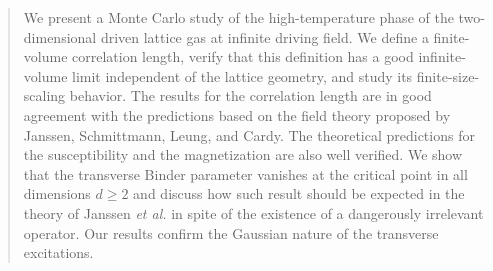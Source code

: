 \documentclass[12pt]{article}
\begin{document}
\newcommand{\co}{ {\cal O}}

\maketitle
\thispagestyle{empty}   %

\vspace{0.2cm}

\begin{abstract}
We present a Monte Carlo study of the high-temperature 
phase of the two-dimensional driven lattice gas 
at infinite driving field. We define a finite-volume 
correlation length, verify that this definition has a good 
infinite-volume limit independent of the lattice geometry, and 
study its finite-size-scaling behavior.  
The results for the correlation length are
in good agreement with the predictions based on the field theory
proposed by Janssen, Schmittmann, Leung, and Cardy.
The theoretical predictions for the susceptibility and 
the magnetization are also well verified.  
We show that the transverse Binder parameter vanishes at the 
critical point in all dimensions $d\ge 2$ and discuss how such 
result should be expected in the theory of Janssen {\em et al.} 
in spite of the existence of a dangerously irrelevant operator.
Our results confirm the Gaussian nature of the transverse excitations.
\end{abstract}

\clearpage


%
%

\newcommand{\reff}[1]{(\ref{#1})}
\newcommand{\kls}{{\sc KLS}}
\newcommand{\su}[2]{\frac{#1}{#2}}
\newcommand{\me}{{\it master equation}}
\newcommand{\db}{{\it detailed balance}}
\newcommand{\ve}[1]{{\bf #1}}

\newcommand{\dlg}{{\sc DLG}}
\newcommand{\fss}{{\sc FSS}}

\newcommand{\pe}[1]{#1_{\bot}}
\newcommand{\pa}[1]{#1_{\|}}
\newcommand{\spint}[1]{\ensuremath{\int {\rm d}^{#1}\ve{x} \, {\rm d}t}}
\newcommand{\imint}[2]{\ensuremath{\int \! \frac{ {\rm
        d}^{#1}\ve{#2}}{(2\pi)^{#1}} \, \frac{{\rm d}\omega}{2\pi}}} 
\newcommand{\nbpa}{\ensuremath{\Delta_{\|}}}
\newcommand{\nbpe}{\ensuremath{\Delta_{\bot}}}
\newcommand{\grpe}{\ensuremath{\vett{\nabla}_{\bot}}}
\newcommand{\grpa}{\ensuremath{\nabla_{\|}}}
\newcommand{\qpeq}{\ensuremath \pe{\ve{q}}^{2}}
\newcommand{\ts}{\ensuremath \tilde{s}}
\newcommand{\G}[2]{\ensuremath \Gamma_{#1\,#2}} 
\newcommand{\tn}{\ensuremath \tilde{n}}
\end{document}
